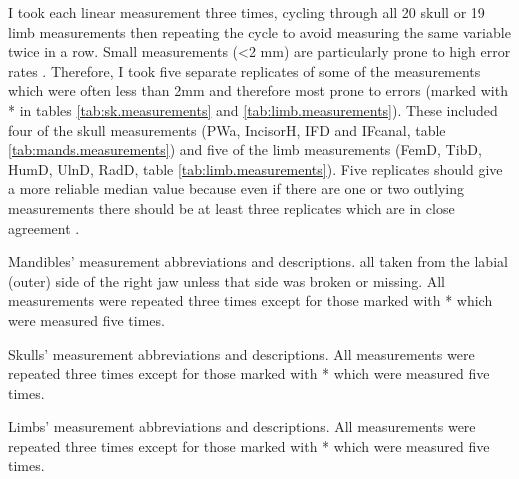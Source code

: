 
	I took each linear measurement three times, cycling through all 20 skull or 19 limb measurements then repeating the cycle to avoid measuring the same variable twice in a row. Small measurements (<2 mm) are particularly prone to high error rates \citep{Cardini2008}. Therefore, I took five separate replicates of some of the measurements which were often less than 2mm and therefore most prone to errors (marked with * in tables \ref{tab:sk.measurements} and  \ref{tab:limb.measurements}). These included four of the skull measurements (PWa, IncisorH, IFD and IFcanal, table \ref{tab:mands.measurements}) and five of the limb measurements (FemD, TibD, HumD, UlnD, RadD, table \ref{tab:limb.measurements}). 
	Five replicates should give a more reliable median value because even if there are one or two outlying measurements there should be at least three replicates which are in close agreement \citep{Cooper2009}.
	



\begin{table}[!htbp]
	\caption[Mandible measurements]
			{Mandibles' measurement abbreviations and descriptions. all taken from the labial (outer) side of the right jaw unless that side was broken or missing. All measurements were repeated three times except for those marked with * which were measured five times.}
	
	\label{tab:mands.measurements}
\end{table}

\begin{table}[!htbp]
	\caption[Skull measurements]
			{Skulls' measurement abbreviations and descriptions. All measurements were repeated three times except for those marked with * which were measured five times.}%
	
	\label{tab:sk.measurements}
\end{table}



\begin{table}[!htbp]
	\caption[Limb measurements]
		{Limbs' measurement abbreviations and descriptions. All measurements were repeated three times except for those marked with * which were measured five times.} %
	
	\label{tab:limb.measurements}
\end{table}


